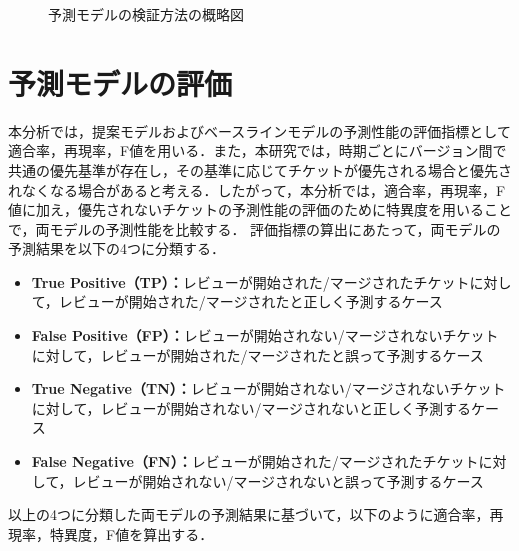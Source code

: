 \documentclass[submit]{ipsj}
\begin{document}
\begin{figure}[t]
\begin{center}
\caption{予測モデルの検証方法の概略図}
\label{fig:predict_schematic}
\end{center}
\end{figure}


\section{予測モデルの評価}\label{sec:hyoka}
本分析では，提案モデルおよびベースラインモデルの予測性能の評価指標として適合率，再現率，F値を用いる．また，本研究では，時期ごとにバージョン間で共通の優先基準が存在し，その基準に応じてチケットが優先される場合と優先されなくなる場合があると考える．したがって，本分析では，適合率，再現率，F値に加え，優先されないチケットの予測性能の評価のために特異度を用いることで，両モデルの予測性能を比較する．
評価指標の算出にあたって，両モデルの予測結果を以下の4つに分類する．

\begin{itemize}
  \item \textbf{True Positive（TP）：}レビューが開始された/マージされたチケットに対して，レビューが開始された/マージされたと正しく予測するケース
  \item \textbf{False Positive（FP）：}レビューが開始されない/マージされないチケットに対して，レビューが開始された/マージされたと誤って予測するケース
  \item \textbf{True Negative（TN）：}レビューが開始されない/マージされないチケットに対して，レビューが開始されない/マージされないと正しく予測するケース
  \item \textbf{False Negative（FN）：}レビューが開始された/マージされたチケットに対して，レビューが開始されない/マージされないと誤って予測するケース
\end{itemize}

以上の4つに分類した両モデルの予測結果に基づいて，以下のように適合率，再現率，特異度，F値を算出する．
\end{document}
